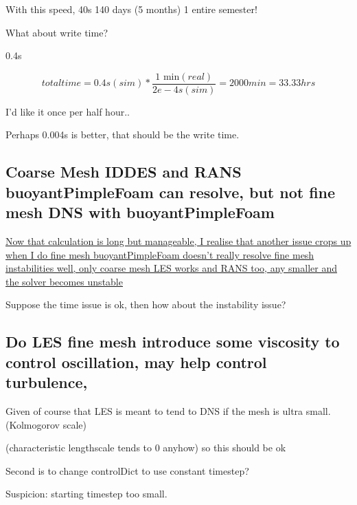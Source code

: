 \documentclass[12pt]{article}
\renewcommand{\_}{\kern-1.5pt\textunderscore\kern-1.5pt}
\begin{document}
\vspace{\baselineskip}
With this speed, 40s  140 days (5 months) 1 entire semester!\par

What about write time?\par

0.4s\par

 \[ total time=0.4s \left( sim \right) \ast\frac{\text{1 min} \left( real \right) }{2e-4s  \left( sim \right) }=2000 min=33.33hrs \] \par

I’d like it once per half hour..\par

Perhaps 0.004s is better, that should be the write time.\par

\subsection{Coarse Mesh IDDES and RANS buoyantPimpleFoam can resolve, but not fine mesh DNS with buoyantPimpleFoam}

\uline{Now that calculation is long but manageable, I realise that another issue crops up when I do fine mesh  buoyantPimpleFoam doesn’t really resolve fine mesh instabilities well, only coarse mesh LES works and RANS too, any smaller and the solver becomes unstable}\par

Suppose the time issue is ok, then how about the instability issue?\par

\subsection{Do LES fine mesh  introduce some viscosity to control oscillation, may help control turbulence,}\par

Given of course that LES is meant to tend to DNS if the mesh is ultra small. (Kolmogorov scale)\par

(characteristic lengthscale tends to 0 anyhow) so this should be ok\par

Second is to change controlDict to use constant timestep?\par

Suspicion: starting timestep too small.\par
\end{document}
